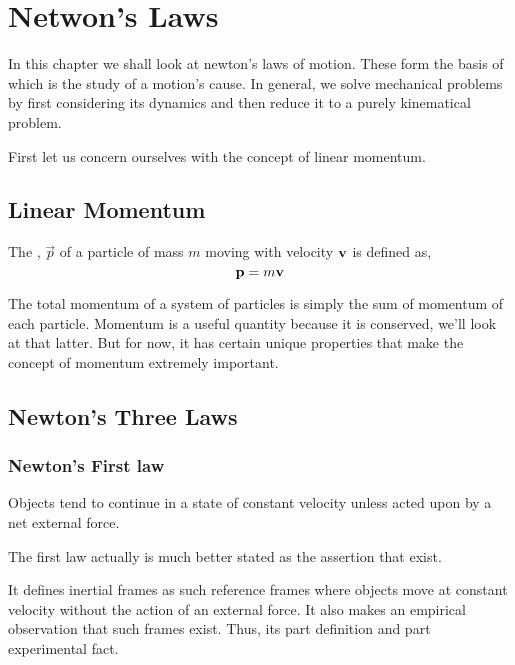 \chapter{Netwon's Laws}

In this chapter we shall look at newton's laws of motion. These form the basis of  which is the 
study of a motion's cause. In general, we solve mechanical problems by first considering its 
dynamics and then reduce it to a purely kinematical problem.

First let us concern ourselves with the concept of {linear momentum}.

\section{Linear Momentum}

\begin{definition}
    The , \(\vec{p}\) of a particle of mass \(m\) moving 
    with velocity \(\boldsymbol{\mathbf{v}}\) is defined as,
    \[\boldsymbol{\mathbf{p}} = m\boldsymbol{\mathbf{v}}\] 
\end{definition}

The total momentum of a system of particles is simply the sum of momentum of each
particle. Momentum is a useful quantity because it is conserved,
we'll look at that latter. But for now, it has certain unique properties 
that make the concept of momentum extremely important.

\section{Newton's Three Laws}

\subsection{Newton's First law}

\begin{axioms}
    \ii Objects tend to continue in a state of constant
    velocity unless acted upon by a net external force.
\end{axioms}

The first law actually is much better stated as the 
assertion that  exist.

It defines inertial frames as such reference frames where 
objects move at constant velocity without the action of an external force.
It also makes an empirical observation that such frames exist. 
Thus, its part definition and part experimental fact.

